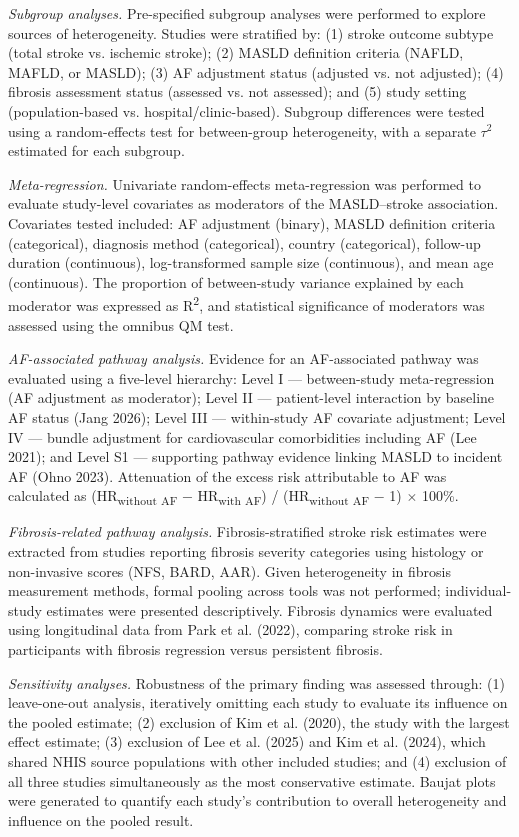 \documentclass[12pt,a4paper]{article}
\begin{document}
\textit{Subgroup analyses.} Pre-specified subgroup analyses were performed to explore sources of heterogeneity. Studies were stratified by: (1) stroke outcome subtype (total stroke vs. ischemic stroke); (2) MASLD definition criteria (NAFLD, MAFLD, or MASLD); (3) AF adjustment status (adjusted vs. not adjusted); (4) fibrosis assessment status (assessed vs. not assessed); and (5) study setting (population-based vs. hospital/clinic-based). Subgroup differences were tested using a random-effects test for between-group heterogeneity, with a separate $\tau^2$ estimated for each subgroup.

\textit{Meta-regression.} Univariate random-effects meta-regression was performed to evaluate study-level covariates as moderators of the MASLD--stroke association. Covariates tested included: AF adjustment (binary), MASLD definition criteria (categorical), diagnosis method (categorical), country (categorical), follow-up duration (continuous), log-transformed sample size (continuous), and mean age (continuous). The proportion of between-study variance explained by each moderator was expressed as R\textsuperscript{2}, and statistical significance of moderators was assessed using the omnibus QM test.

\textit{AF-associated pathway analysis.} Evidence for an AF-associated pathway was evaluated using a five-level hierarchy: Level I — between-study meta-regression (AF adjustment as moderator); Level II — patient-level interaction by baseline AF status (Jang 2026); Level III — within-study AF covariate adjustment; Level IV — bundle adjustment for cardiovascular comorbidities including AF (Lee 2021); and Level S1 — supporting pathway evidence linking MASLD to incident AF (Ohno 2023). Attenuation of the excess risk attributable to AF was calculated as (HR\textsubscript{without AF} $-$ HR\textsubscript{with AF}) / (HR\textsubscript{without AF} $-$ 1) $\times$ 100\%.

\textit{Fibrosis-related pathway analysis.} Fibrosis-stratified stroke risk estimates were extracted from studies reporting fibrosis severity categories using histology or non-invasive scores (NFS, BARD, AAR). Given heterogeneity in fibrosis measurement methods, formal pooling across tools was not performed; individual-study estimates were presented descriptively. Fibrosis dynamics were evaluated using longitudinal data from Park et al. (2022), comparing stroke risk in participants with fibrosis regression versus persistent fibrosis.

\textit{Sensitivity analyses.} Robustness of the primary finding was assessed through: (1) leave-one-out analysis, iteratively omitting each study to evaluate its influence on the pooled estimate; (2) exclusion of Kim et al. (2020), the study with the largest effect estimate; (3) exclusion of Lee et al. (2025) and Kim et al. (2024), which shared NHIS source populations with other included studies; and (4) exclusion of all three studies simultaneously as the most conservative estimate. Baujat plots were generated to quantify each study's contribution to overall heterogeneity and influence on the pooled result.
\end{document}
